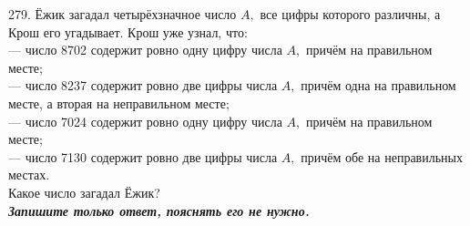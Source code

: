 279. Ёжик загадал четырёхзначное число $A,$ все цифры которого различны, а Крош его угадывает. Крош уже узнал, что:\\
 --- число 8702 содержит ровно одну цифру числа $A,$ причём на правильном месте;\\
 --- число 8237 содержит ровно две цифры числа $A,$ причём одна на правильном месте, а вторая на неправильном месте;\\
 --- число 7024 содержит ровно одну цифру числа $A,$ причём на правильном месте;\\
 --- число 7130 содержит ровно две цифры числа $A,$ причём обе на неправильных местах.\\
 Какое число загадал Ёжик?\\
  {\it {\textbf {Запишите только ответ, пояснять его не нужно.}}}\\
